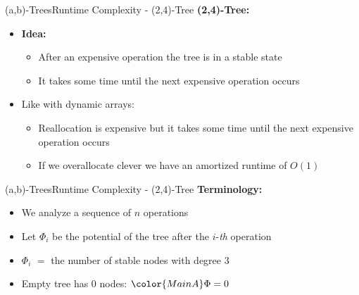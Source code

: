 
\begin{frame}{(a,b)-Trees}{Runtime Complexity - (2,4)-Tree}
  \textbf{(2,4)-Tree:}
  \begin{itemize}
    \item
      \textbf{Idea:}
      \begin{itemize}
        \item<2->
          After an expensive operation the tree is in a stable state
        \item<3->
          It takes some time until the next expensive operation occurs
      \end{itemize}
    \item<4->
      Like with dynamic arrays:
      \begin{itemize}
        \item<5->
          {\color{MainA}Reallocation} is expensive but it takes some time
          until the next expensive operation occurs
        \item<6->
          If we {\color{MainA}overallocate} clever we have an amortized
          runtime of {\color{MainA}$O(1)$}
      \end{itemize}
  \end{itemize}
\end{frame}


\begin{frame}{(a,b)-Trees}{Runtime Complexity - (2,4)-Tree}
  \textbf{Terminology:}
  \begin{itemize}
    \item<2->
      We analyze a sequence of {\color{MainA}$n$} operations
    \item<3->
      Let {\color{MainA}$\Phi_i$} be the potential of the tree after
      the {\color{MainA}$i$}-\textit{th} operation
    \item<4->
      {\color{MainA}$\Phi_i$}
      $=$ the number of stable nodes with {\color{MainA}degree 3}
    \item<5->
      Empty tree has 0 nodes: ${\color{MainA}\Phi} = 0$
  \end{itemize}
\end{frame}


